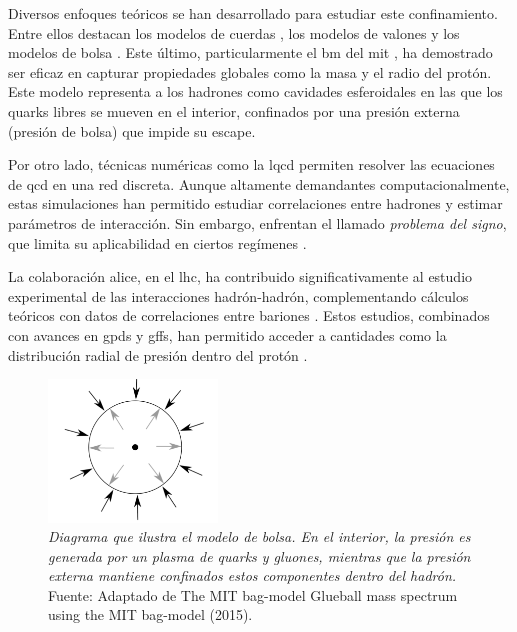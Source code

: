 Diversos enfoques teóricos se han desarrollado para estudiar este confinamiento. Entre ellos destacan los modelos de cuerdas \cite{Artru1974,Andersson_1983}, los modelos de valones \cite{Hwa_1981} y los modelos de bolsa \cite{AIHPA_1968__8_2_163_0,DeTar_1983}. Este último, particularmente el \gls{bm} del \gls{mit} \cite{Chodos_1974,Chodos1974a}, ha demostrado ser eficaz en capturar propiedades globales como la masa y el radio del protón. Este modelo representa a los hadrones como cavidades esferoidales en las que los quarks libres se mueven en el interior, confinados por una presión externa (presión de bolsa) que impide su escape.

Por otro lado, técnicas numéricas como la \gls{lqcd} permiten resolver las ecuaciones de \gls{qcd} en una red discreta. Aunque altamente demandantes computacionalmente, estas simulaciones han permitido estudiar correlaciones entre hadrones y estimar parámetros de interacción. Sin embargo, enfrentan el llamado \emph{problema del signo}, que limita su aplicabilidad en ciertos regímenes \cite{Iritani_2019,Hatsuda_2017}.

La colaboración \gls{alice}, en el \gls{lhc}, ha contribuido significativamente al estudio experimental de las interacciones hadrón-hadrón, complementando cálculos teóricos con datos de correlaciones entre bariones \cite{Collaboration2020,Collaboration2021}. Estos estudios, combinados con avances en \glspl{gpd} y \glspl{gff}, han permitido acceder a cantidades como la distribución radial de presión dentro del protón \cite{Burkert_2018}.

\begin{figure}
    \centering
    \includegraphics[width=0.4\textwidth]{./Images/Bag model.png}
    \caption[Diagrama de bolsa]{\emph{Diagrama que ilustra el modelo de bolsa. En el interior, la presión es generada por un plasma de quarks y gluones, mientras que la presión externa mantiene confinados estos componentes dentro del hadrón.} Fuente: Adaptado de The MIT bag-model Glueball mass spectrum using the MIT bag-model (2015).}
    \label{fig:Bolsa }
\end{figure}

